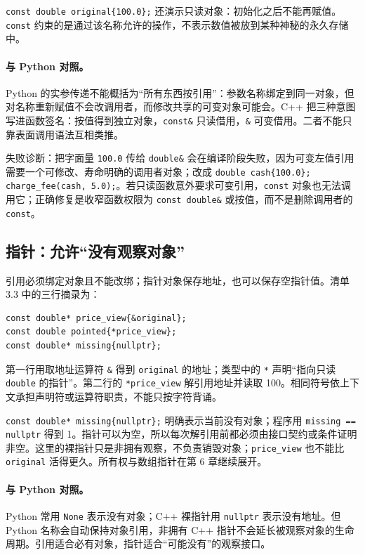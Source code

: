 \texttt{const double original\{100.0\};} 还演示只读对象：初始化之后不能再赋值。\texttt{const} 约束的是通过该名称允许的操作，不表示数值被放到某种神秘的永久存储中。

\paragraph{与 Python 对照。}
Python 的实参传递不能概括为“所有东西按引用”：参数名称绑定到同一对象，但对名称重新赋值不会改调用者，而修改共享的可变对象可能会。C++ 把三种意图写进函数签名：按值得到独立对象，\texttt{const\&} 只读借用，\texttt{\&} 可变借用。二者不能只靠表面调用语法互相类推。

失败诊断：把字面量 \texttt{100.0} 传给 \texttt{double\&} 会在编译阶段失败，因为可变左值引用需要一个可修改、寿命明确的调用者对象；改成 \texttt{double cash\{100.0\}; charge\_fee(cash, 5.0);}。若只读函数意外要求可变引用，\texttt{const} 对象也无法调用它；正确修复是收窄函数权限为 \texttt{const double\&} 或按值，而不是删除调用者的 \texttt{const}。

\subsection{指针：允许“没有观察对象”}

引用必须绑定对象且不能改绑；指针对象保存地址，也可以保存空指针值。清单 3.3 中的三行摘录为：

\begin{lstlisting}
const double* price_view{&original};
const double pointed{*price_view};
const double* missing{nullptr};
\end{lstlisting}

第一行用取地址运算符 \texttt{\&} 得到 \texttt{original} 的地址；类型中的 \texttt{*} 声明“指向只读 \texttt{double} 的指针”。第二行的 \texttt{*price\_view} 解引用地址并读取 100。相同符号依上下文承担声明符或运算符职责，不能只按字符背诵。

\texttt{const double* missing\{nullptr\};} 明确表示当前没有对象；程序用 \texttt{missing == nullptr} 得到 1。指针可以为空，所以每次解引用前都必须由接口契约或条件证明非空。这里的裸指针只是非拥有观察，不负责销毁对象；\texttt{price\_view} 也不能比 \texttt{original} 活得更久。所有权与数组指针在第 6 章继续展开。

\paragraph{与 Python 对照。}
Python 常用 \texttt{None} 表示没有对象；C++ 裸指针用 \texttt{nullptr} 表示没有地址。但 Python 名称会自动保持对象引用，非拥有 C++ 指针不会延长被观察对象的生命周期。引用适合必有对象，指针适合“可能没有”的观察接口。

